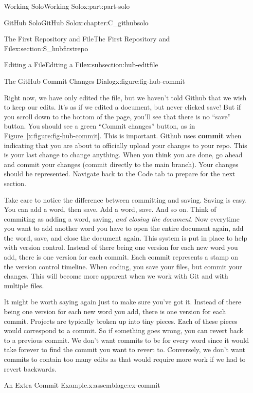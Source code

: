\documentclass[oneside,10pt,]{book}
\newcommand{\xreffont}{\relax}
\newcommand{\terminology}[1]{\textbf{#1}}
\begin{document}
\begin{partptx}{Working Solo}{}{Working Solo}{}{}{x:part:part-solo}
\begin{chapterptx}{GitHub Solo}{}{GitHub Solo}{}{}{x:chapter:C_githubsolo}
\begin{sectionptx}{The First Repository and File}{}{The First Repository and File}{}{}{x:section:S_hubfirstrepo}
\begin{subsectionptx}{Editing a File}{}{Editing a File}{}{}{x:subsection:hub-editfile}
\begin{figureptx}{The GitHub Commit Changes Dialog}{x:figure:fig-hub-commit}{}
\begin{image}{0.05}{0.9}{0.05}
\end{image}%
\tcblower
\end{figureptx}%
 Right now, we have only edited the file, but we haven't told Github that we wish to keep our edits. It's as if we edited a document, but never clicked save! But if you scroll down to the bottom of the page, you'll see that there is no ``save'' button. You should see a green ``Commit changes'' button, as in \hyperref[x:figure:fig-hub-commit]{Figure~{\xreffont\ref{x:figure:fig-hub-commit}}}. This is important. Github uses \terminology{commit} when indicating that you are about to officially upload your changes to your repo. This is your last change to change anything. When you think you are done, go ahead and commit your changes (commit directly to the main branch). Your changes should be represented. Navigate back to the Code tab to prepare for the next section.%
\par
Take care to notice the difference between committing and saving. Saving is easy. You can add a word, then save. Add a word, save. And so on. Think of commiting as adding a word, saving, \emph{and closing the document}. Now everytime you want to add another word you have to open the entire document again, add the word, save, and close the document again. This system is put in place to help with version control. Instead of there being one version for each new word you add, there is one version for each commit. Each commit represents a stamp on the version control timeline. When coding, you save your files, but commit your changes. This will become more apparent when we work with Git and with multiple files.%
\par
It might be worth saying again just to make sure you've got it. Instead of there being one version for each new word you add, there is one version for each commit. Projects are typically broken up into tiny pieces. Each of these pieces would correspond to a commit. So if something goes wrong, you can revert back to a previous commit. We don't want commits to be for every word since it would take forever to find the commit you want to revert to. Conversely, we don't want commits to contain too many edits as that would require more work if we had to revert backwards.%
\begin{assemblage}{An Extra Commit Example.}{x:assemblage:ex-commit}%

\end{assemblage}
\end{subsectionptx}
\end{sectionptx}
\end{chapterptx}
\end{partptx}
\end{document}
